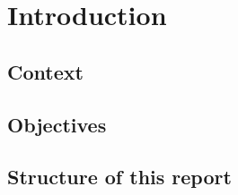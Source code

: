 \chapter{Introduction}
\label{chap:introduction}

\section{Context}

\lipsum[1]

\section{Objectives}

\lipsum[1]

\section{Structure of this report}

\lipsum[1]
